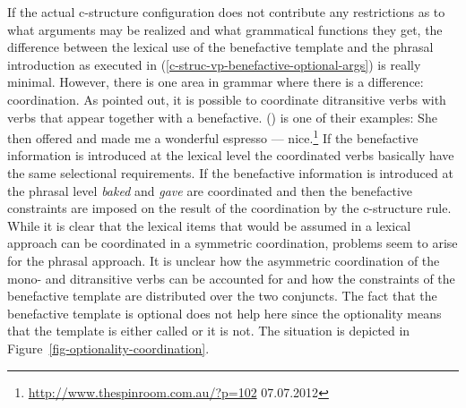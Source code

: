 If the actual c-structure configuration does not contribute any restrictions as to what arguments
may be realized and what grammatical functions they get, the difference between the lexical use of the
benefactive template and the phrasal introduction as executed in
(\ref{c-struc-vp-benefactive-optional-args}) is really minimal. However, there is one area in
grammar where there is a difference: coordination. As \citet[Section~6.1]{MWArgSt} pointed out, it is
possible to coordinate ditransitive verbs with verbs that appear together with a
benefactive. () is one of their examples:
\ea%
\label{ex-coordination-benefactive}
\label{ex-offered-and-made}
She then offered and made me a wonderful espresso --- nice.\footnote{%
  \url{http://www.thespinroom.com.au/?p=102} 07.07.2012}
\z
If the benefactive information is introduced at the lexical level the coordinated verbs basically
have the same selectional requirements. If the benefactive information is introduced at the phrasal
level \emph{baked} and \emph{gave} are coordinated and then the benefactive constraints are imposed
on the result of the coordination by the c-structure rule. While it is clear that the lexical items
that would be assumed in a lexical approach can be coordinated in a symmetric coordination, problems
seem to arise for the phrasal approach. It is unclear how the asymmetric coordination of the mono-
and ditransitive verbs can be accounted for and how the constraints of the benefactive template are
distributed over the two conjuncts. The fact that the benefactive template is optional does not help
here since the optionality means that the template is either called or it is not. The situation is
depicted in Figure~\vref{fig-optionality-coordination}.
